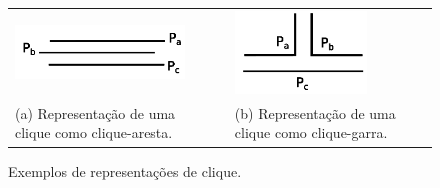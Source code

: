
\begin{figure}[h]
  \centering
  \begin{tabular}{  p{4cm} p{0.7cm} p{4cm} }
    \includegraphics[width=4.5cm]{img/edge-clique.png} & &
    \includegraphics[width=3.5cm]{img/claw-clique.png}%
    \\
    \footnotesize %
    (a)  \footnotesize Representação de uma  clique como clique-aresta. && \footnotesize (b) Representação de uma  clique como clique-garra.\\
  \end{tabular}

 \caption{Exemplos de representações de clique.} \label{fig:cliquesRepresentation}
\end{figure}